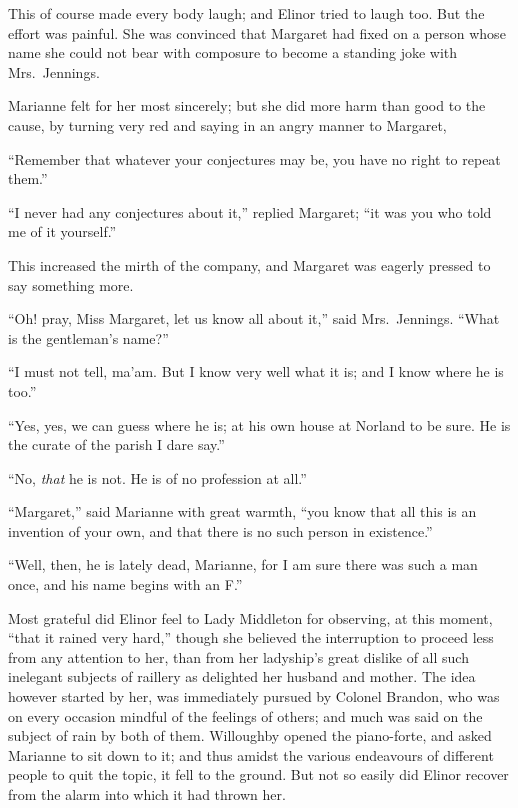 This of course made every body laugh; and Elinor
tried to laugh too.  But the effort was painful.
She was convinced that Margaret had fixed on a person
whose name she could not bear with composure to become
a standing joke with Mrs.\ Jennings.

Marianne felt for her most sincerely; but she did
more harm than good to the cause, by turning very red
and saying in an angry manner to Margaret,

``Remember that whatever your conjectures may be,
you have no right to repeat them.''

``I never had any conjectures about it,'' replied Margaret;
``it was you who told me of it yourself.''

This increased the mirth of the company, and Margaret
was eagerly pressed to say something more.

``Oh! pray, Miss Margaret, let us know all about it,''
said Mrs.\ Jennings.  ``What is the gentleman's name?''

``I must not tell, ma'am. But I know very well what it is;
and I know where he is too.''

``Yes, yes, we can guess where he is; at his own house
at Norland to be sure.  He is the curate of the parish
I dare say.''

``No, \emph{that} he is not.  He is of no profession at all.''

``Margaret,'' said Marianne with great warmth,
``you know that all this is an invention of your own,
and that there is no such person in existence.''

``Well, then, he is lately dead, Marianne, for I
am sure there was such a man once, and his name begins
with an F.''

Most grateful did Elinor feel to Lady Middleton
for observing, at this moment, ``that it rained very hard,''
though she believed the interruption to proceed less from
any attention to her, than from her ladyship's great dislike
of all such inelegant subjects of raillery as delighted
her husband and mother.  The idea however started by her,
was immediately pursued by Colonel Brandon, who was
on every occasion mindful of the feelings of others;
and much was said on the subject of rain by both of them.
Willoughby opened the piano-forte, and asked Marianne
to sit down to it; and thus amidst the various endeavours
of different people to quit the topic, it fell to the ground.
But not so easily did Elinor recover from the alarm into
which it had thrown her.

